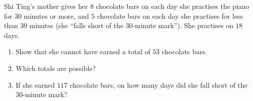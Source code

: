 Shi Ting's mother gives her $8$ chocolate bars on each day she practises the piano for $30$ minutes or more, and $5$ chocolate bars on each day she practises for less than $30$ minutes (she ``falls short of the $30$-minute mark''). She practises on $18$ days.
\begin{enumerate}
\item[(a)] Show that she cannot have earned a total of $53$ chocolate bars.
\item[(b)] Which totals are possible?
\item[(c)] If she earned $117$ chocolate bars, on how many days did she fall short of the $30$-minute mark?
\end{enumerate}
